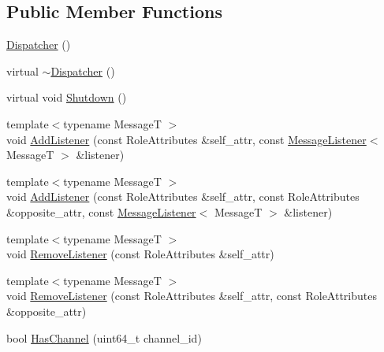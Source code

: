 \subsection*{Public Member Functions}
\begin{DoxyCompactItemize}
\item 
\hyperlink{classapollo_1_1cyber_1_1transport_1_1Dispatcher_a7b740666b178815f3bef327a223fe39f}{Dispatcher} ()
\item 
virtual \hyperlink{classapollo_1_1cyber_1_1transport_1_1Dispatcher_a6d28df2005ee5409e4dedb0e80a6bb91}{$\sim$\-Dispatcher} ()
\item 
virtual void \hyperlink{classapollo_1_1cyber_1_1transport_1_1Dispatcher_a87c80d37d0b6218218ad888888ad0d08}{Shutdown} ()
\item 
{\footnotesize template$<$typename Message\-T $>$ }\\void \hyperlink{classapollo_1_1cyber_1_1transport_1_1Dispatcher_a0e145dae91537eb77d7b09745b08bd97}{Add\-Listener} (const Role\-Attributes \&self\-\_\-attr, const \hyperlink{namespaceapollo_1_1cyber_1_1transport_aade3f4d41770972ae44166cdde27e2d8}{Message\-Listener}$<$ Message\-T $>$ \&listener)
\item 
{\footnotesize template$<$typename Message\-T $>$ }\\void \hyperlink{classapollo_1_1cyber_1_1transport_1_1Dispatcher_a57032c00ea89222e65f3c3c5ce2ca498}{Add\-Listener} (const Role\-Attributes \&self\-\_\-attr, const Role\-Attributes \&opposite\-\_\-attr, const \hyperlink{namespaceapollo_1_1cyber_1_1transport_aade3f4d41770972ae44166cdde27e2d8}{Message\-Listener}$<$ Message\-T $>$ \&listener)
\item 
{\footnotesize template$<$typename Message\-T $>$ }\\void \hyperlink{classapollo_1_1cyber_1_1transport_1_1Dispatcher_a24ced235e749abc47265d6ffade4f8bc}{Remove\-Listener} (const Role\-Attributes \&self\-\_\-attr)
\item 
{\footnotesize template$<$typename Message\-T $>$ }\\void \hyperlink{classapollo_1_1cyber_1_1transport_1_1Dispatcher_af81d7e383f5cb1c4b92ab4dd84125997}{Remove\-Listener} (const Role\-Attributes \&self\-\_\-attr, const Role\-Attributes \&opposite\-\_\-attr)
\item 
bool \hyperlink{classapollo_1_1cyber_1_1transport_1_1Dispatcher_a7bea7181659fa46204434dbdba90e00f}{Has\-Channel} (uint64\-\_\-t channel\-\_\-id)
\end{DoxyCompactItemize}
